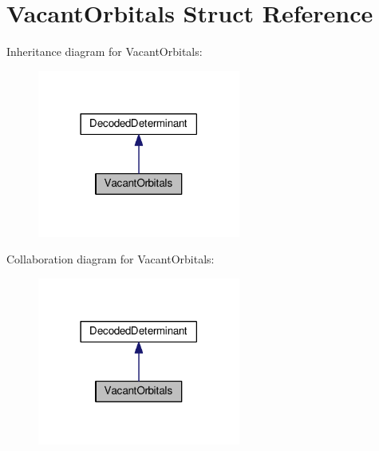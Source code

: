 \hypertarget{structVacantOrbitals}{}\section{Vacant\+Orbitals Struct Reference}
\label{structVacantOrbitals}


Inheritance diagram for Vacant\+Orbitals\+:\nopagebreak
\begin{figure}[H]
\begin{center}
\leavevmode
\includegraphics[width=189pt]{structVacantOrbitals__inherit__graph}
\end{center}
\end{figure}


Collaboration diagram for Vacant\+Orbitals\+:\nopagebreak
\begin{figure}[H]
\begin{center}
\leavevmode
\includegraphics[width=189pt]{structVacantOrbitals__coll__graph}
\end{center}
\end{figure}
